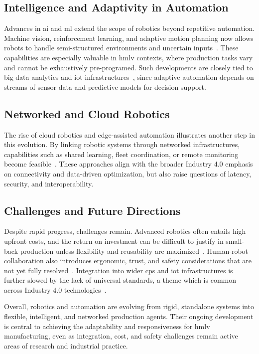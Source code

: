 \subsection{Intelligence and Adaptivity in Automation}

Advances in \ac{ai} and \ac{ml} extend the scope of robotics beyond repetitive automation.
Machine vision, reinforcement learning, and adaptive motion planning now allows robots to handle semi-structured environments and uncertain inputs~\cite{kragic-interactive-collaborative-robots-challenges-and}.
These capabilities are especially valuable in \ac{hmlv} contexts, where production tasks vary and cannot be exhaustively pre-programed.
Such developments are closely tied to big data analytics and \ac{iot} infrastructures~\cite{LEE-2015-a-cps-for-indsutry40-based-manufacturing-systems,xu-industry-40-state-of-the-art-and-future-trends}, since adaptive automation depends on streams of sensor data and predictive models for decision support.

\subsection{Networked and Cloud Robotics}

The rise of cloud robotics and edge-assisted automation illustrates another step in this evolution.
By linking robotic systems through networked infrastructures, capabilities such as shared learning, fleet coordination, or remote monitoring become feasible~\cite{kehow-a-survey-of-research-on-cloud-robotics-and-automation}.
These approaches align with the broader Industry 4.0 emphasis on connectivity and data-driven optimization, but also raise questions of latency, security, and interoperability.

\subsection{Challenges and Future Directions}

Despite rapid progress, challenges remain. Advanced robotics often entails high upfront costs, and the return on investment can be difficult to justify in small-back production unless flexibility and reusability are maximized~\cite{bortolini-reconfigurable-manufacturing-systems-literature-review}.
Human-robot collaboration also introduces ergonomic, trust, and safety considerations that are not yet fully resolved~\cite{villani-survey-on-human-robot-collaboration-in-industrial-settings}.
Integration into wider \ac{cps} and \ac{iot} infrastructures is further slowed by the lack of universal standards, a theme which is common across Industry 4.0 technologies~\cite{monsori-cpps-roots-expectations-rnd-challenges,xu-industry-40-state-of-the-art-and-future-trends}.

Overall, robotics and automation are evolving from rigid, standalone systems into flexible, intelligent, and networked production agents. Their ongoing development is central to achieving the adaptability and responsiveness for \ac{hmlv} manufacturing, even as integration, cost, and safety challenges remain active areas of research and industrial practice.
